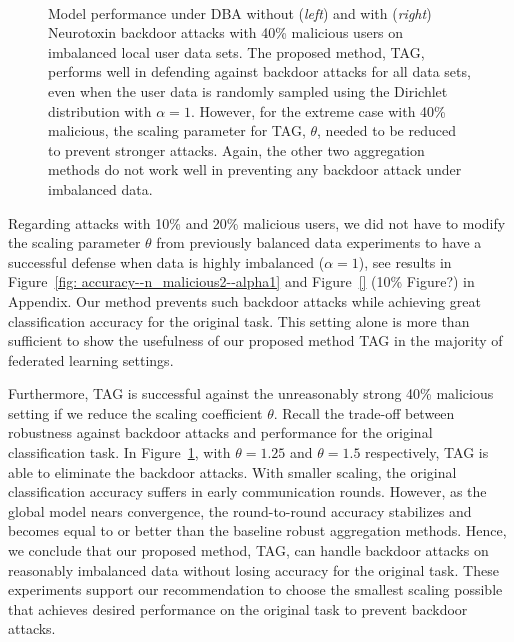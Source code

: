 \documentclass{article} %
\newcommand{\yli}[1]{{\color{cyan}#1}}
\begin{document}
\begin{figure}[htp]
\centering
  \begin{subfigure}{.35\textwidth}
  \centering
  \end{subfigure}%
  ~
  \begin{subfigure}{.65\textwidth}
  \centering
  \end{subfigure}%

\caption{\footnotesize Model performance under DBA without (\textit{left}) and with (\textit{right}) Neurotoxin backdoor attacks with 40\% malicious users on imbalanced local user data sets. The proposed method, TAG, performs well in defending against backdoor attacks for all data sets, even when the user data is randomly sampled using the Dirichlet distribution with $\alpha = 1$. However, for the extreme case with 40\% malicious, the scaling parameter for TAG, $\theta$, needed to be reduced to prevent stronger attacks. Again, the other two aggregation methods do not work well in preventing any backdoor attack under imbalanced data.}
\label{fig: accuracy--n_malicious4--alpha1}

\end{figure}


\yli{Regarding attacks with 10\% and 20\% malicious users, we did not have to modify the scaling parameter $\theta$ from previously balanced data experiments to have a successful defense when data is highly imbalanced ($\alpha = 1$), see results in Figure~\ref{fig: accuracy--n_malicious2--alpha1} and Figure~\ref{} (10\% Figure?) in Appendix.}
Our method prevents such backdoor attacks while achieving great classification accuracy for the original task. This setting alone is more than sufficient to show the usefulness of our proposed method TAG in the majority of federated learning settings.

Furthermore, TAG is successful against the unreasonably strong 40\% malicious setting if we reduce the scaling coefficient $\theta$. Recall the trade-off between robustness against backdoor attacks and performance for the original classification task. In Figure~\ref{fig: accuracy--n_malicious4--alpha1}, with $\theta=1.25$ and $\theta=1.5$ respectively, TAG is able to eliminate the backdoor attacks. With smaller scaling, the original classification accuracy suffers in early communication rounds. However, as the global model nears convergence, the round-to-round accuracy stabilizes and becomes equal to or better than the baseline robust aggregation methods. Hence, we conclude that our proposed method, TAG, can handle backdoor attacks on reasonably imbalanced data without losing accuracy for the original task. These experiments support our recommendation to choose the smallest scaling possible that achieves desired performance on the original task to prevent backdoor attacks.
\end{document}
